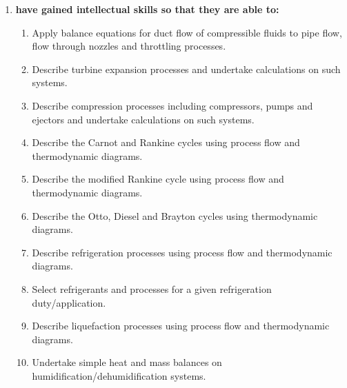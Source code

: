 \documentclass[12pts,a4paper,amsmath,amssymb,floatfix]{article}%
\begin{document}
\begin{enumerate}[{\bf A.}]
\item {\bf have gained intellectual skills so that they are able to:}
  \begin{enumerate}
    \item Apply balance equations for duct flow of compressible fluids to pipe flow, flow through nozzles and throttling processes.
    \item Describe turbine expansion processes and undertake calculations on such systems.
    \item Describe compression processes including compressors, pumps and ejectors and undertake calculations on such systems.
    \item Describe the Carnot and Rankine cycles using process flow and thermodynamic diagrams.
    \item Describe the modified Rankine cycle using process flow and thermodynamic diagrams.
    \item Describe the Otto, Diesel and Brayton cycles using thermodynamic diagrams.
    \item Describe refrigeration processes using process flow and thermodynamic diagrams.
    \item Select refrigerants and processes for a given refrigeration duty/application.
    \item Describe liquefaction processes using process flow and thermodynamic diagrams.
    \item Undertake simple heat and mass balances on humidification/dehumidification systems.
  \end{enumerate}


\end{enumerate}
\end{document}
